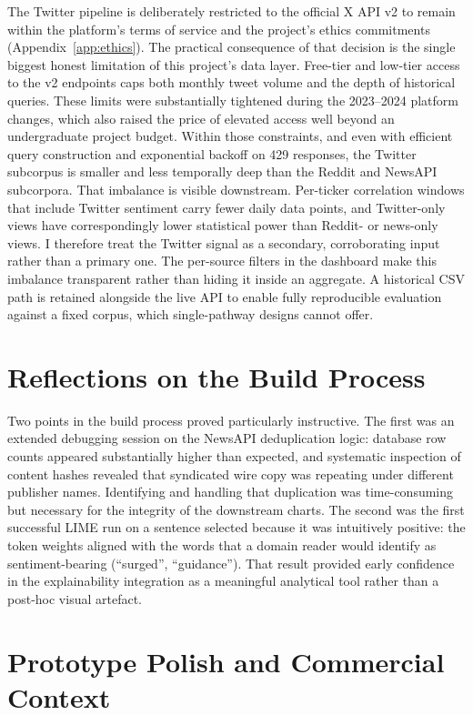 The Twitter pipeline is deliberately restricted to the official X API v2 to remain within the platform's terms of service and the project's ethics commitments (Appendix~\ref{app:ethics}). The practical consequence of that decision is the single biggest honest limitation of this project's data layer. Free-tier and low-tier access to the v2 endpoints caps both monthly tweet volume and the depth of historical queries. These limits were substantially tightened during the 2023--2024 platform changes, which also raised the price of elevated access well beyond an undergraduate project budget. Within those constraints, and even with efficient query construction and exponential backoff on 429 responses, the Twitter subcorpus is smaller and less temporally deep than the Reddit and NewsAPI subcorpora. That imbalance is visible downstream. Per-ticker correlation windows that include Twitter sentiment carry fewer daily data points, and Twitter-only views have correspondingly lower statistical power than Reddit- or news-only views. I therefore treat the Twitter signal as a secondary, corroborating input rather than a primary one. The per-source filters in the dashboard make this imbalance transparent rather than hiding it inside an aggregate. A historical CSV path is retained alongside the live API to enable fully reproducible evaluation against a fixed corpus, which single-pathway designs cannot offer.

\section{Reflections on the Build Process}

Two points in the build process proved particularly instructive. The first was an extended debugging session on the NewsAPI deduplication logic: database row counts appeared substantially higher than expected, and systematic inspection of content hashes revealed that syndicated wire copy was repeating under different publisher names. Identifying and handling that duplication was time-consuming but necessary for the integrity of the downstream charts. The second was the first successful LIME run on a sentence selected because it was intuitively positive: the token weights aligned with the words that a domain reader would identify as sentiment-bearing (``surged'', ``guidance''). That result provided early confidence in the explainability integration as a meaningful analytical tool rather than a post-hoc visual artefact.

\section{Prototype Polish and Commercial Context}

